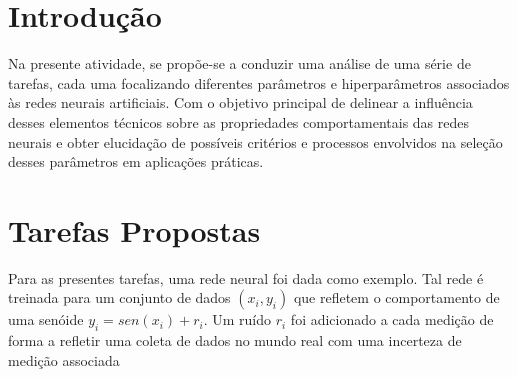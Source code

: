 \documentclass[
	article,			%
	11pt,				%
	oneside,			%
	a4paper,			%
	english,			%
	brazil,				%
	sumario=tradicional
	]{abntex2}
\begin{document}
\textual

\section{Introdução}

Na presente atividade, se propõe-se a conduzir uma análise de uma série de tarefas, cada uma focalizando diferentes parâmetros e hiperparâmetros associados às redes neurais artificiais. Com o objetivo principal de delinear a influência desses elementos técnicos sobre as propriedades comportamentais das redes neurais e obter elucidação de possíveis critérios e processos envolvidos na seleção desses parâmetros em aplicações práticas.

\section{Tarefas Propostas}

Para as presentes tarefas, uma rede neural foi dada como exemplo. Tal rede é treinada para um conjunto de dados ${(x_i, y_i)}$ que refletem o comportamento de uma senóide $y_i = sen(x_i) + r_i$. Um ruído $r_i$ foi adicionado a cada medição de forma a refletir uma coleta de dados no mundo real com uma incerteza de medição associada


%
\end{document}
